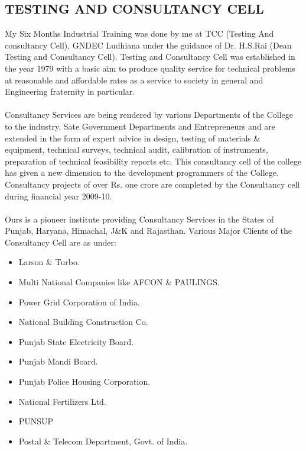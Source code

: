 \subsection{TESTING AND CONSULTANCY CELL}
My Six Months Industrial Training was done by me at TCC (Testing And consultancy Cell),
GNDEC Ludhiana under the guidance of Dr. H.S.Rai (Dean Testing and Consultancy Cell).
Testing and Consultancy Cell was established in the year 1979 with a basic aim to produce
quality service for technical problems at reasonable and affordable rates as a service to society
in general and Engineering fraternity in particular.\\ \\
Consultancy Services are being rendered by various Departments of the College to the
industry, Sate Government Departments and Entrepreneurs and are extended in the form of
expert advice in design, testing of materials \& equipment, technical surveys, technical audit,
calibration of instruments, preparation of technical feasibility reports etc.
This consultancy cell of the college has given a new dimension to the development
programmers of the College. Consultancy projects of over Rs. one crore are completed by the
Consultancy cell during financial year 2009-10. \\ \\
Ours is a pioneer institute providing Consultancy Services in the States of Punjab, Haryana,
Himachal, J\&K and Rajasthan. Various Major Clients of the Consultancy Cell are as under:\\
\begin{itemize}
\item Larson \& Turbo.
\item Multi National Companies like AFCON \& PAULINGS.
\item Power Grid Corporation of India.
\item National Building Construction Co.
\item Punjab State Electricity Board.
\item Punjab Mandi Board.
\item Punjab Police Housing Corporation.
\item National Fertilizers Ltd.
\item PUNSUP
\item Postal \& Telecom Department, Govt. of India.
\end{itemize}

